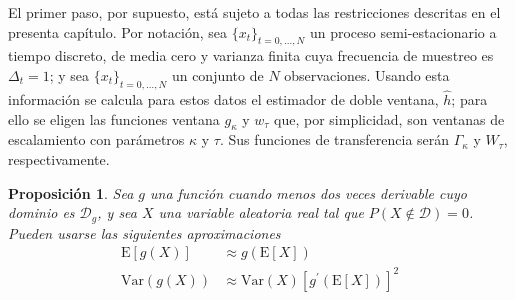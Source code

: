 \documentclass[12pt,letterpaper]{book}
\newtheorem{proposicion}[teorema]{Proposición}
\newcommand{\prima}{^{\prime}}
\newcommand{\E}[1]{\mathrm{E}\left[ #1 \right]}
\newcommand{\Var}[1]{\mathrm{Var}\left( #1 \right)}
\newcommand{\xtd}{$\{x_t\}_{t=0,\dots,N}$ }
\begin{document}

El primer paso, por supuesto, está sujeto a todas las restricciones descritas en el presenta capítulo.
%
Por notación, sea \xtd un proceso semi-estacionario a tiempo discreto, de media cero y varianza finita cuya frecuencia de muestreo es $\Delta_t=1$; y sea \xtd un conjunto de $N$ observaciones.
%
Usando esta información se calcula para estos datos el estimador de doble ventana, $\widehat{h}$; para ello se eligen las funciones ventana $g_\kappa$ y $w_\tau$ que, por simplicidad, son ventanas de escalamiento con parámetros $\kappa$ y $\tau$. 
%
Sus funciones de transferencia serán $\Gamma_\kappa$ y $W_\tau$, respectivamente.

\begin{proposicion}
Sea $g$ una función cuando menos dos veces derivable cuyo dominio es $\mathcal{D}_g$, y sea $X$ una variable aleatoria real tal que $P(X\notin \mathcal{D}) = 0$. 
%
Pueden usarse las siguientes aproximaciones
\begin{align}
\E{g(X)} &\approx g\left( \E{X} \right) \\
\Var{g(X)} &\approx \Var{X} \left[ g\prima \left( \E{X} \right) \right]^{2}
\end{align}
\end{proposicion}
\end{document}
